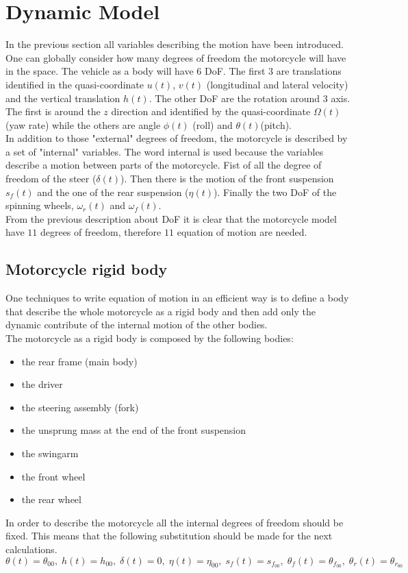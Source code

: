 \section{Dynamic Model}
%
In the previous section all variables describing the motion have been introduced. One can globally consider how many degrees of freedom the motorcycle will have in the space. The vehicle as a body will have 6 DoF. The first 3 are translations identified in the quasi-coordinate $u(t)$, $v(t)$ (longitudinal and lateral velocity) and the vertical translation $h(t)$. The other DoF are the rotation around 3 axis. The first is around the $z$ direction and identified by the quasi-coordinate $\Omega(t)$ (yaw rate) while the others are angle $\phi(t)$ (roll) and $\theta(t)$(pitch).\\
In addition to those "external" degrees of freedom, the motorcycle is described by a set of "internal" variables. The word internal is used because the variables describe a motion between parts of the motorcycle. Fist of all the degree of freedom of the steer ($\delta(t)$). Then there is the motion of the front suspension $s_f(t)$ and the one of the rear suspension ($\eta(t)$). Finally the two DoF of the spinning wheels, $\omega_r(t)$ and $\omega_f(t)$.\\
From the previous description about DoF it is clear that the motorcycle model have $11$ degrees of freedom, therefore $11$ equation of motion are needed.
%
\subsection{Motorcycle rigid body}
%
One techniques to write equation of motion in an efficient way is to define a body that describe the whole motorcycle as a rigid body and then add only the dynamic contribute of the internal motion of the other bodies.\\
The motorcycle as a rigid body is composed by the following bodies:
\begin{itemize}
    \setlength{\itemsep}{0pt}
    \item the rear frame (main body)
    \item the driver
    \item the steering  assembly (fork)
    \item the unsprung mass at the end of the front suspension
    \item the swingarm
    \item the front wheel
    \item the rear wheel
\end{itemize}
%
In order to describe the motorcycle all the internal degrees of freedom should be fixed. This means that the following substitution should be made for the next calculations.
%
\begin{equation*}
    \theta \left( t \right) =\theta_{00},\;h
    \left( t \right) =h_{00},\;\delta \left( t \right) =0,\;\eta \left( t
    \right) =\eta_{00},\;s_{f} \left( t \right) =s_{f_{00}},\;\theta_{f}
    \left( t \right) =\theta_{f_{00}},\;\theta_{r} \left( t \right) =\theta
   _{r_{00}}   
\end{equation*}
%
